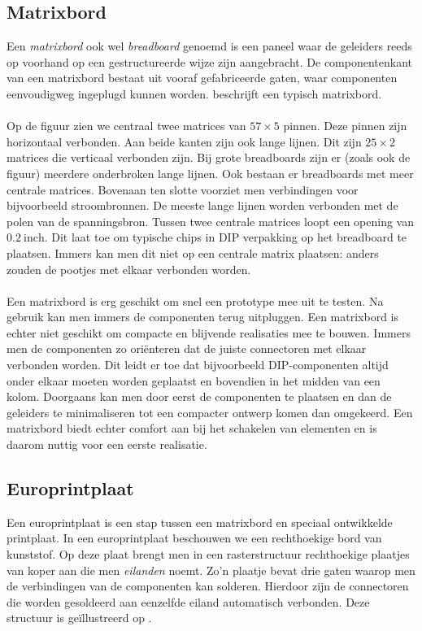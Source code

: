 \subsection{Matrixbord}
Een \emph{matrixbord} ook wel \emph{breadboard} genoemd is een paneel waar de geleiders reeds op voorhand op een gestructureerde wijze zijn aangebracht. De componentenkant van een matrixbord bestaat uit vooraf gefabriceerde gaten, waar componenten eenvoudigweg ingeplugd kunnen worden.  beschrijft een typisch matrixbord.
\paragraph{}
Op de figuur zien we centraal twee matrices van $57\times 5$ pinnen. Deze pinnen zijn horizontaal verbonden. Aan beide kanten zijn ook lange lijnen. Dit zijn $25\times 2$ matrices die verticaal verbonden zijn. Bij grote breadboards zijn er (zoals ook de figuur) meerdere onderbroken lange lijnen. Ook bestaan er breadboards met meer centrale matrices. Bovenaan ten slotte voorziet men verbindingen voor bijvoorbeeld stroombronnen. De meeste lange lijnen worden verbonden met de polen van de spanningsbron. Tussen twee centrale matrices loopt een opening van $0.2~\mbox{inch}$. Dit laat toe om typische chips in DIP verpakking op het breadboard te plaatsen. Immers kan men dit niet op een centrale matrix plaatsen: anders zouden de pootjes met elkaar verbonden worden.
\paragraph{}
Een matrixbord is erg geschikt om snel een prototype mee uit te testen. Na gebruik kan men immers de componenten terug uitpluggen. Een matrixbord is echter niet geschikt om compacte en blijvende realisaties mee te bouwen. Immers men de componenten zo ori\"enteren dat de juiste connectoren met elkaar verbonden worden. Dit leidt er toe dat bijvoorbeeld DIP-componenten altijd onder elkaar moeten worden geplaatst en bovendien in het midden van een kolom. Doorgaans kan men door eerst de componenten te plaatsen en dan de geleiders te minimaliseren tot een compacter ontwerp komen dan omgekeerd. Een matrixbord biedt echter comfort aan bij het schakelen van elementen en is daarom nuttig voor een eerste realisatie.
\subsection{Europrintplaat}
Een europrintplaat is een stap tussen een matrixbord en speciaal ontwikkelde printplaat. In een europrintplaat beschouwen we een rechthoekige bord van kunststof. Op deze plaat brengt men in een rasterstructuur rechthoekige plaatjes van koper aan die men \emph{eilanden} noemt. Zo'n plaatje bevat drie gaten waarop men de verbindingen van de componenten kan solderen. Hierdoor zijn de connectoren die worden gesoldeerd aan eenzelfde eiland automatisch verbonden. Deze structuur is ge\"illustreerd op .
